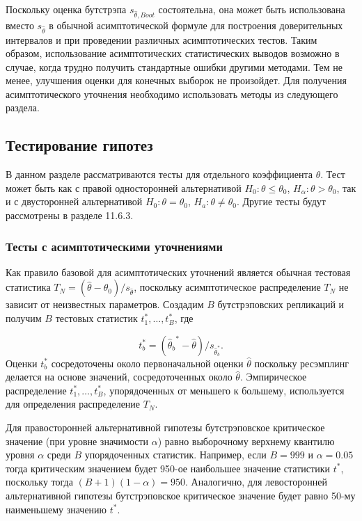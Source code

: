 Поскольку оценка бутстрэпа $s_{\hat{\theta},Boot}$ состоятельна, она может быть использована вместо $s_{\hat{\theta}}$ в обычной асимптотической формуле для построения доверительных интервалов и при проведении различных асимптотических тестов. Таким образом, использование асимптотических статистических выводов возможно в случае, когда трудно получить стандартные ошибки другими методами. Тем не менее, улучшения оценки для конечных выборок не произойдет. Для получения асимптотического уточнения необходимо использовать методы из следующего раздела.

\subsection{Тестирование гипотез}

В данном разделе рассматриваются тесты для отдельного коэффициента $\theta$. Тест может быть как с правой односторонней альтернативой $H_0:\theta \leq \theta_0$, $H_{\alpha}:\theta > \theta_0$, так и с двусторонней альтернативой $H_0: \theta = \theta_0$, $H_a: \theta \not= \theta_0$. Другие тесты будут рассмотрены в разделе 11.6.3.

\subsubsection*{Тесты с асимптотическими уточнениями}

Как правило базовой для асимптотических уточнений является обычная тестовая статистика $T_N=(\hat{\theta}-\theta_0)/s_{\hat{\theta}}$, поскольку асимптотическое распределение $T_N$ не зависит от неизвестных параметров. Создадим $B$ бутстрэповских репликаций и получим $B$ тестовых статистик $t_1^*,\ldots ,t_B^*$, где 

\begin{equation}
t_b^*=({\hat{\theta}_b}^*-\hat{\theta})/s_{{\hat{\theta}}_b^*}.
\end{equation}
Оценки $t_b^*$ сосредоточены около первоначальной оценки $\hat{\theta}$ поскольку ресэмплинг делается на основе значений, сосредоточенных около $\hat{\theta}$. Эмпирическое распределение $t_1^*, \ldots, t_B^*$, упорядоченных от меньшего к большему, используется для определения распределение $T_N$.

Для правосторонней альтернативной гипотезы бутстрэповское критическое значение (при уровне значимости $\alpha$) равно выборочному верхнему квантилю уровня $\alpha$ среди $B$ упорядоченных статистик. Например, если $B=999$ и $\alpha=0.05$ тогда критическим значением будет 950-ое наибольшее значение статистики $t^*$, поскольку тогда $(B+1)(1-\alpha)=950$. Аналогично, для левосторонней альтернативной гипотезы  бутстрэповское критическое значение  будет равно 50-му наименьшему значению $t^*$.

